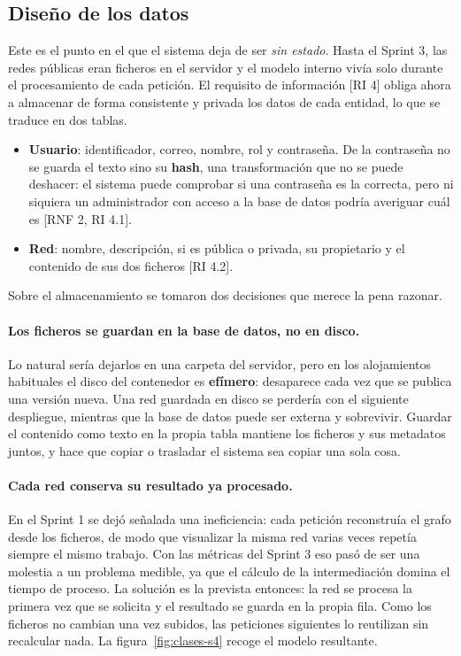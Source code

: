 \subsection{Diseño de los datos}

Este es el punto en el que el sistema deja de ser \textit{sin estado}. Hasta el Sprint 3, las redes
públicas eran ficheros en el servidor y el modelo interno vivía solo durante el procesamiento de
cada petición. El requisito de información [RI 4] obliga ahora a almacenar de forma consistente y
privada los datos de cada entidad, lo que se traduce en dos tablas.

\begin{itemize}
	\item \textbf{Usuario}: identificador, correo, nombre, rol y contraseña. De la contraseña no se
		guarda el texto sino su \textbf{hash}, una transformación que no se puede deshacer: el
		sistema puede comprobar si una contraseña es la correcta, pero ni siquiera un administrador
		con acceso a la base de datos podría averiguar cuál es [RNF 2, RI 4.1].
	\item \textbf{Red}: nombre, descripción, si es pública o privada, su propietario y el contenido
		de sus dos ficheros [RI 4.2].
\end{itemize}

Sobre el almacenamiento se tomaron dos decisiones que merece la pena razonar.

\paragraph*{Los ficheros se guardan en la base de datos, no en disco.} Lo natural sería dejarlos en
una carpeta del servidor, pero en los alojamientos habituales el disco del contenedor es
\textbf{efímero}: desaparece cada vez que se publica una versión nueva. Una red guardada en disco se
perdería con el siguiente despliegue, mientras que la base de datos puede ser externa y sobrevivir.
Guardar el contenido como texto en la propia tabla mantiene los ficheros y sus metadatos juntos, y
hace que copiar o trasladar el sistema sea copiar una sola cosa.

\paragraph*{Cada red conserva su resultado ya procesado.} En el Sprint 1 se dejó señalada una
ineficiencia: cada petición reconstruía el grafo desde los ficheros, de modo que visualizar la misma
red varias veces repetía siempre el mismo trabajo. Con las métricas del Sprint 3 eso pasó de ser una
molestia a un problema medible, ya que el cálculo de la intermediación domina el tiempo de proceso.
La solución es la prevista entonces: la red se procesa la primera vez que se solicita y el resultado
se guarda en la propia fila. Como los ficheros no cambian una vez subidos, las peticiones siguientes
lo reutilizan sin recalcular nada. La figura~\ref{fig:clases-s4} recoge el modelo resultante.


